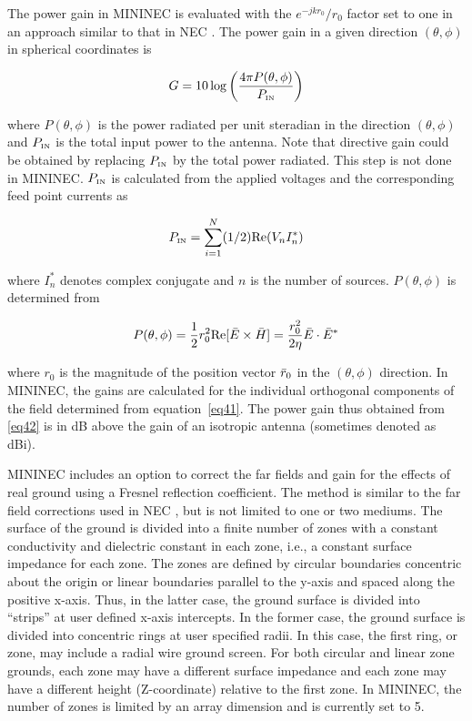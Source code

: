 \documentclass[12pt]{article}
\begin{document}
The power gain in MININEC is evaluated with the $e^{-jkr_0} / r_0$
factor set to one in an approach similar to that in NEC
\cite{r4}. The power gain in a given direction
$(\theta, \phi)$ in spherical coordinates is

\begin{equation}
G = 10 \log\left(\frac{4\pi P(\theta,\phi)}{P_{\mbox{\tiny IN}}}\right)
\label{eq42}
\end{equation}

\noindent where $P(\theta,\phi)$ is the power radiated per unit steradian in the
direction $(\theta, \phi)$ and $P_{\mbox{\tiny IN}}$ is the total input power to the
antenna. Note that directive gain could be obtained by replacing
$P_{\mbox{\tiny IN}}$ by the total power radiated. This step is not done in MININEC.
$P_{\mbox{\tiny IN}}$ is calculated from the applied voltages and the corresponding
feed point currents as

\begin{equation}
P_{\mbox{\tiny IN}} = \sum_{i=1}^{N}(1/2) \mathrm{Re}(V_n I_n^*)
\label{eq43}
\end{equation}

\noindent where $I_n^*$ denotes complex conjugate and $n$ is the number of
sources. $P(\theta,\phi)$ is determined from

\begin{equation}
P(\theta,\phi) = \frac{1}{2} r_0^2 \mathrm{Re}[\bar{E}\times\bar{H}]
= \frac{r_0^2}{2\eta}\bar{E}\cdot\bar{E}^*
\label{eq44}
\end{equation}

\noindent
where $r_0$ is the magnitude of the position vector $\bar{r}_0$ in the
$(\theta,\phi)$ direction. In MININEC, the gains are calculated for the
individual orthogonal components of the field determined from
equation~\eqref{eq41}. The power gain thus obtained from \eqref{eq42} is
in dB above the gain of an isotropic antenna (sometimes denoted as dBi).

MININEC includes an option to correct the far fields and gain for the
effects of real ground using a Fresnel reflection coefficient. The
method is similar to the far field corrections used in NEC
\cite{r4}, but is not limited to one or two mediums. The
surface of the ground is divided into a finite number of zones with a
constant conductivity and dielectric constant in each zone, i.e., a
constant surface impedance for each zone. The zones are defined by
circular boundaries concentric about the origin or linear boundaries
parallel to the y-axis and spaced along the positive x-axis. Thus, in
the latter case, the ground surface is divided into ``strips'' at user
defined x-axis intercepts. In the former case, the ground surface is
divided into concentric rings at user specified radii. In this case, the
first ring, or zone, may include a radial wire ground screen. For both
circular and linear zone grounds, each zone may have a different surface
impedance and each zone may have a different height (Z-coordinate)
relative to the first zone. In MININEC, the number of zones is limited
by an array dimension and is currently set to 5.
\end{document}
